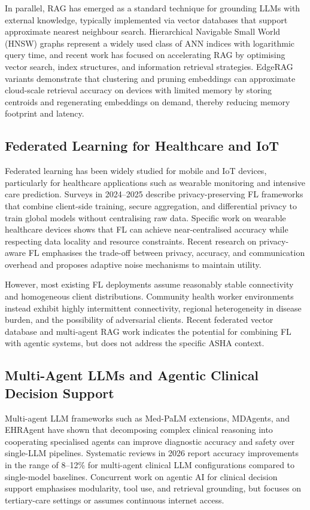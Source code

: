 \documentclass[conference]{IEEEtran}
\begin{document}
In parallel, RAG has emerged as a standard technique for grounding LLMs with external knowledge, typically implemented via vector databases that support approximate nearest neighbour search. Hierarchical Navigable Small World (HNSW) graphs represent a widely used class of ANN indices with logarithmic query time, and recent work has focused on accelerating RAG by optimising vector search, index structures, and information retrieval strategies. EdgeRAG variants demonstrate that clustering and pruning embeddings can approximate cloud-scale retrieval accuracy on devices with limited memory by storing centroids and regenerating embeddings on demand, thereby reducing memory footprint and latency.

\subsection{Federated Learning for Healthcare and IoT}
Federated learning has been widely studied for mobile and IoT devices, particularly for healthcare applications such as wearable monitoring and intensive care prediction. Surveys in 2024--2025 describe privacy-preserving FL frameworks that combine client-side training, secure aggregation, and differential privacy to train global models without centralising raw data. Specific work on wearable healthcare devices shows that FL can achieve near-centralised accuracy while respecting data locality and resource constraints. Recent research on privacy-aware FL emphasises the trade-off between privacy, accuracy, and communication overhead and proposes adaptive noise mechanisms to maintain utility.

However, most existing FL deployments assume reasonably stable connectivity and homogeneous client distributions. Community health worker environments instead exhibit highly intermittent connectivity, regional heterogeneity in disease burden, and the possibility of adversarial clients. Recent federated vector database and multi-agent RAG work indicates the potential for combining FL with agentic systems, but does not address the specific ASHA context.

\subsection{Multi-Agent LLMs and Agentic Clinical Decision Support}
Multi-agent LLM frameworks such as Med-PaLM extensions, MDAgents, and EHRAgent have shown that decomposing complex clinical reasoning into cooperating specialised agents can improve diagnostic accuracy and safety over single-LLM pipelines. Systematic reviews in 2026 report accuracy improvements in the range of 8--12\% for multi-agent clinical LLM configurations compared to single-model baselines. Concurrent work on agentic AI for clinical decision support emphasises modularity, tool use, and retrieval grounding, but focuses on tertiary-care settings or assumes continuous internet access.
\end{document}
